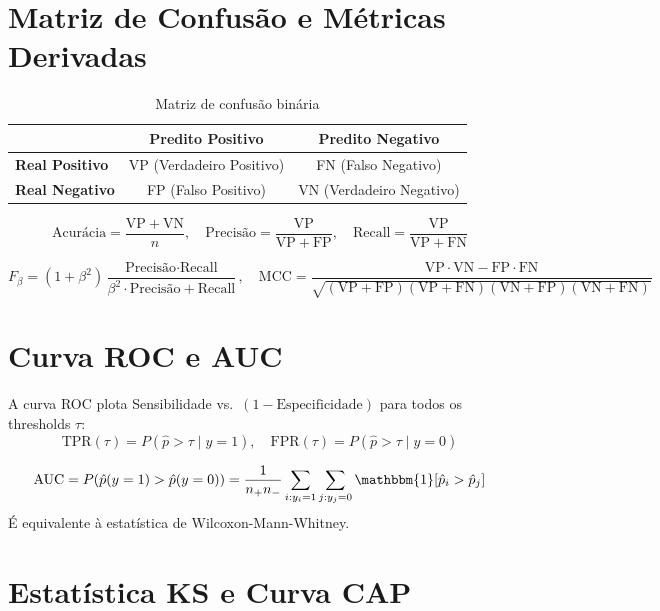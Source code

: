 \documentclass[12pt,a4paper,twoside]{book}
\theoremstyle{definition}
\theoremstyle{remark}
\begin{document}
\section{Matriz de Confusão e Métricas Derivadas}

\begin{table}[H]
\centering
\caption{Matriz de confusão binária}
\begin{tabular}{lcc}
\toprule
 & \textbf{Predito Positivo} & \textbf{Predito Negativo} \\
\midrule
\textbf{Real Positivo} & VP (Verdadeiro Positivo) & FN (Falso Negativo) \\
\textbf{Real Negativo} & FP (Falso Positivo) & VN (Verdadeiro Negativo) \\
\bottomrule
\end{tabular}
\end{table}

\[
\text{Acurácia} = \frac{\mathrm{VP}+\mathrm{VN}}{n}, \quad
\text{Precisão} = \frac{\mathrm{VP}}{\mathrm{VP}+\mathrm{FP}}, \quad
\text{Recall} = \frac{\mathrm{VP}}{\mathrm{VP}+\mathrm{FN}}
\]

\[
F_\beta = (1+\beta^2)\frac{\text{Precisão}\cdot\text{Recall}}{\beta^2\cdot\text{Precisão}+\text{Recall}}, \quad
\text{MCC} = \frac{\mathrm{VP}\cdot\mathrm{VN} - \mathrm{FP}\cdot\mathrm{FN}}{\sqrt{(\mathrm{VP}+\mathrm{FP})(\mathrm{VP}+\mathrm{FN})(\mathrm{VN}+\mathrm{FP})(\mathrm{VN}+\mathrm{FN})}}
\]

\section{Curva ROC e AUC}

A curva ROC plota Sensibilidade vs.\ $(1-\text{Especificidade})$ para todos os thresholds $\tau$:
\[
\mathrm{TPR}(\tau) = P(\hat{p} > \tau \mid y=1), \quad \mathrm{FPR}(\tau) = P(\hat{p} > \tau \mid y=0)
\]

\begin{tcolorbox}[teobox,title=Interpretação probabilística da AUC]
\[
\mathrm{AUC} = P(\hat{p}(y=1) > \hat{p}(y=0)) = \frac{1}{n_+ n_-}\sum_{i: y_i=1}\sum_{j: y_j=0} \mathbbm{1}[\hat{p}_i > \hat{p}_j]
\]
É equivalente à estatística de Wilcoxon-Mann-Whitney.
\end{tcolorbox}

\section{Estatística KS e Curva CAP}
\end{document}
